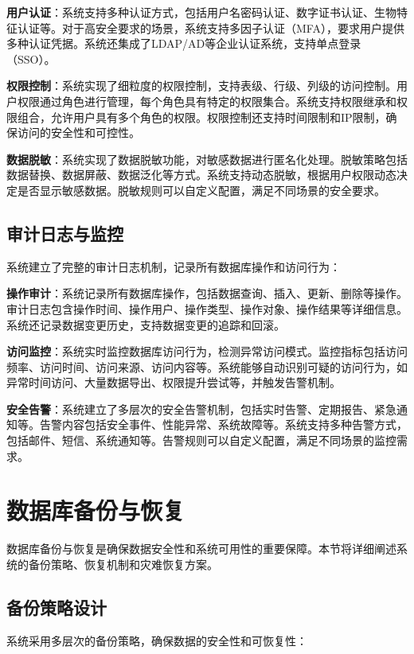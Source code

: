 \textbf{用户认证}：系统支持多种认证方式，包括用户名密码认证、数字证书认证、生物特征认证等。对于高安全要求的场景，系统支持多因子认证（MFA），要求用户提供多种认证凭据。系统还集成了LDAP/AD等企业认证系统，支持单点登录（SSO）。

\textbf{权限控制}：系统实现了细粒度的权限控制，支持表级、行级、列级的访问控制。用户权限通过角色进行管理，每个角色具有特定的权限集合。系统支持权限继承和权限组合，允许用户具有多个角色的权限。权限控制还支持时间限制和IP限制，确保访问的安全性和可控性。

\textbf{数据脱敏}：系统实现了数据脱敏功能，对敏感数据进行匿名化处理。脱敏策略包括数据替换、数据屏蔽、数据泛化等方式。系统支持动态脱敏，根据用户权限动态决定是否显示敏感数据。脱敏规则可以自定义配置，满足不同场景的安全要求。

\subsection{审计日志与监控}

系统建立了完整的审计日志机制，记录所有数据库操作和访问行为：

\textbf{操作审计}：系统记录所有数据库操作，包括数据查询、插入、更新、删除等操作。审计日志包含操作时间、操作用户、操作类型、操作对象、操作结果等详细信息。系统还记录数据变更历史，支持数据变更的追踪和回滚。

\textbf{访问监控}：系统实时监控数据库访问行为，检测异常访问模式。监控指标包括访问频率、访问时间、访问来源、访问内容等。系统能够自动识别可疑的访问行为，如异常时间访问、大量数据导出、权限提升尝试等，并触发告警机制。

\textbf{安全告警}：系统建立了多层次的安全告警机制，包括实时告警、定期报告、紧急通知等。告警内容包括安全事件、性能异常、系统故障等。系统支持多种告警方式，包括邮件、短信、系统通知等。告警规则可以自定义配置，满足不同场景的监控需求。

\section{数据库备份与恢复}

数据库备份与恢复是确保数据安全性和系统可用性的重要保障。本节将详细阐述系统的备份策略、恢复机制和灾难恢复方案。

\subsection{备份策略设计}

系统采用多层次的备份策略，确保数据的安全性和可恢复性：


